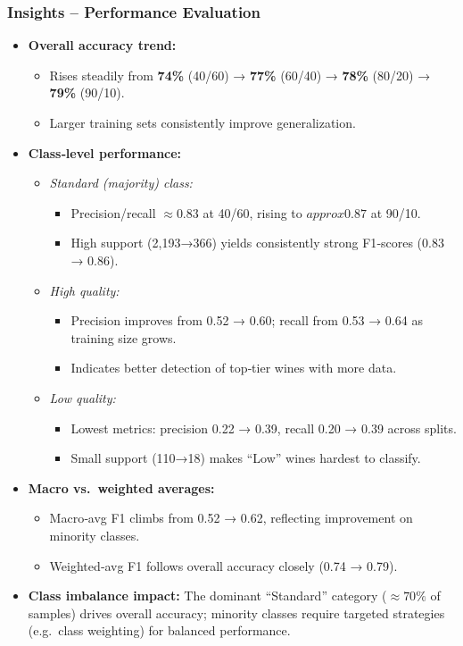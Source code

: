 \subsubsection*{Insights – Performance Evaluation}
\begin{itemize}
	\item \textbf{Overall accuracy trend:}
	      \begin{itemize}
		      \item Rises steadily from \textbf{74\%} (40/60) → \textbf{77\%} (60/40) → \textbf{78\%} (80/20) → \textbf{79\%} (90/10).
		      \item Larger training sets consistently improve generalization.
	      \end{itemize}
	\item \textbf{Class‑level performance:}
	      \begin{itemize}
		      \item \emph{Standard (majority) class:}
		            \begin{itemize}
			            \item Precision/recall \(\approx0.83\) at 40/60, rising to \(approx0.87\) at 90/10.
			            \item High support (2,193→366) yields consistently strong F1‑scores (0.83 → 0.86).
		            \end{itemize}
		      \item \emph{High quality:}
		            \begin{itemize}
			            \item Precision improves from 0.52 → 0.60; recall from 0.53 → 0.64 as training size grows.
			            \item Indicates better detection of top‐tier wines with more data.
		            \end{itemize}
		      \item \emph{Low quality:}
		            \begin{itemize}
			            \item Lowest metrics: precision 0.22 → 0.39, recall 0.20 → 0.39 across splits.
			            \item Small support (110→18) makes “Low” wines hardest to classify.
		            \end{itemize}
	      \end{itemize}
	\item \textbf{Macro vs.\ weighted averages:}
	      \begin{itemize}
		      \item Macro‑avg F1 climbs from 0.52 → 0.62, reflecting improvement on minority classes.
		      \item Weighted‑avg F1 follows overall accuracy closely (0.74 → 0.79).
	      \end{itemize}
	\item \textbf{Class imbalance impact:}
	      The dominant “Standard” category (\(\approx70\%\) of samples) drives overall accuracy; minority classes require targeted strategies (e.g.\ class weighting) for balanced performance.
\end{itemize}

